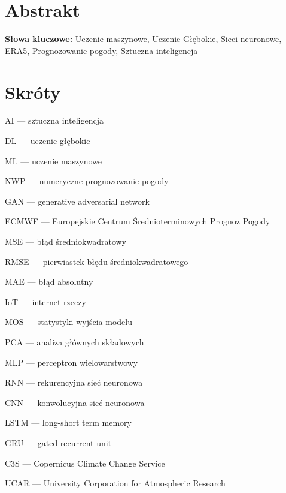 \documentclass{article}
\begin{document}

\begin{titlepage}
    
\end{titlepage}

\tableofcontents
\pagebreak

\section*{Abstrakt}

\noindent
{\bf Słowa kluczowe:} Uczenie maszynowe, Uczenie Głębokie, Sieci neuronowe,
ERA5, Prognozowanie pogody, Sztuczna inteligencja
\pagebreak



% 






\section*{Skróty}

\raggedright{}

AI — sztuczna inteligencja

DL — uczenie głębokie

ML — uczenie maszynowe

NWP — numeryczne prognozowanie pogody

GAN — generative adversarial network

ECMWF — Europejskie Centrum Średnioterminowych Prognoz Pogody

MSE — błąd średniokwadratowy

RMSE — pierwiastek błędu średniokwadratowego

MAE — błąd absolutny

IoT — internet rzeczy

MOS — statystyki wyjścia modelu

PCA — analiza głównych składowych

MLP — perceptron wielowarstwowy

RNN — rekurencyjna sieć neuronowa

CNN — konwolucyjna sieć neuronowa

LSTM — long-short term memory

GRU — gated recurrent unit

C3S — Copernicus Climate Change Service

UCAR — University Corporation for Atmospheric Research

\pagebreak
\printbibliography[title={Bibliografia}]

\end{document}
